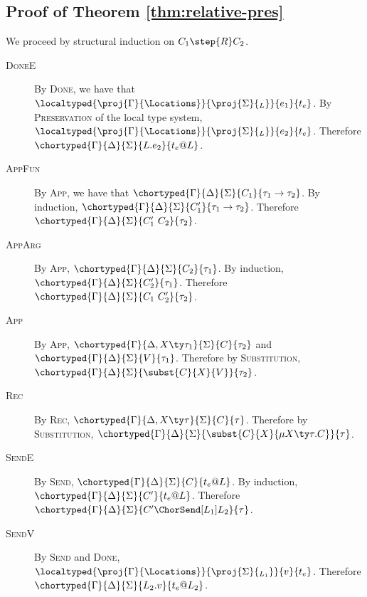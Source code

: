 \subsection{Proof of Theorem \ref{thm:relative-pres}}
We proceed by structural induction on $C_1 \step{R} C_2$.
\begin{description}
  \item[\textsc{DoneE}]
  By \textsc{Done}, we have that $\localtyped{\proj{\Gamma}{\Locations}}{\proj{\Sigma}{_L}}{e_1}{t_e}$.
  By \textsc{Preservation} of the local type system, $\localtyped{\proj{\Gamma}{\Locations}}{\proj{\Sigma}{_L}}{e_2}{t_e}$.
  Therefore $\chortyped{\Gamma}{\Delta}{\Sigma}{L.e_2}{t_e @ L}$.

  \item[\textsc{AppFun}]
  By \textsc{App}, we have that $\chortyped{\Gamma}{\Delta}{\Sigma}{C_1}{\tau_1 \to \tau_2}$.
  By induction, $\chortyped{\Gamma}{\Delta}{\Sigma}{C_1'}{\tau_1 \to \tau_2}$.
  Therefore $\chortyped{\Gamma}{\Delta}{\Sigma}{C_1'~C_2}{\tau_2}$.

  \item[\textsc{AppArg}]
  By \textsc{App}, $\chortyped{\Gamma}{\Delta}{\Sigma}{C_2}{\tau_1}$.
  By induction, $\chortyped{\Gamma}{\Delta}{\Sigma}{C_2'}{\tau_1}$.
  Therefore $\chortyped{\Gamma}{\Delta}{\Sigma}{C_1~C_2'}{\tau_2}$.

  \item[\textsc{App}]
  By \textsc{App}, $\chortyped{\Gamma}{\Delta, X \ty \tau_1}{\Sigma}{C}{\tau_2}$ and $\chortyped{\Gamma}{\Delta}{\Sigma}{V}{\tau_1}$.
  Therefore by \textsc{Substitution}, $\chortyped{\Gamma}{\Delta}{\Sigma}{\subst{C}{X}{V}}{\tau_2}$.

  \item[\textsc{Rec}]
  By \textsc{Rec}, $\chortyped{\Gamma}{\Delta, X \ty \tau}{\Sigma}{C}{\tau}$.
  Therefore by \textsc{Substitution}, $\chortyped{\Gamma}{\Delta}{\Sigma}{\subst{C}{X}{\mu X \ty \tau.C}}{\tau}$.

  \item[\textsc{SendE}]
  By \textsc{Send}, $\chortyped{\Gamma}{\Delta}{\Sigma}{C}{t_e @ L}$.
  By induction, $\chortyped{\Gamma}{\Delta}{\Sigma}{C'}{t_e @ L}$.
  Therefore $\chortyped{\Gamma}{\Delta}{\Sigma}{C' \ChorSend[L_1] L_2}{\tau}$.

  \item[\textsc{SendV}]
  By \textsc{Send} and \textsc{Done}, $\localtyped{\proj{\Gamma}{\Locations}}{\proj{\Sigma}{_{L_1}}}{v}{t_e}$.
  Therefore $\chortyped{\Gamma}{\Delta}{\Sigma}{L_2.v}{t_e @ L_2}$.


\end{description}
